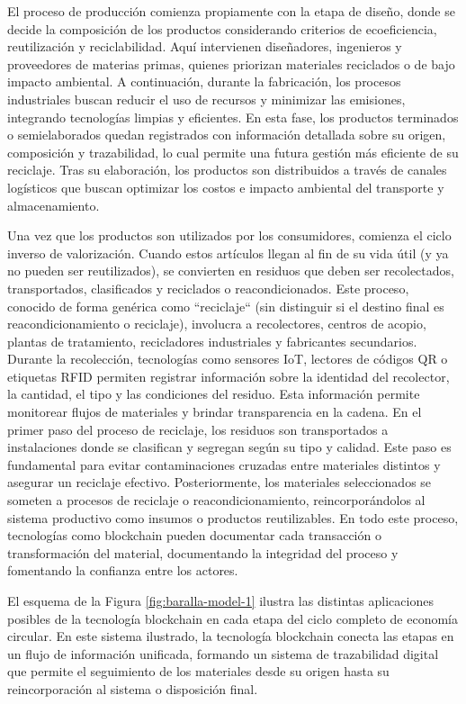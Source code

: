 El proceso de producción comienza propiamente con la etapa de diseño, donde se decide la composición de los productos considerando criterios de ecoeficiencia, reutilización y reciclabilidad. Aquí intervienen diseñadores, ingenieros y proveedores de materias primas, quienes priorizan materiales reciclados o de bajo impacto ambiental. A continuación, durante la fabricación, los procesos industriales buscan reducir el uso de recursos y minimizar las emisiones, integrando tecnologías limpias y eficientes. En esta fase, los productos terminados o semielaborados quedan registrados con información detallada sobre su origen, composición y trazabilidad, lo cual permite una futura gestión más eficiente de su reciclaje. Tras su elaboración, los productos son distribuidos a través de canales logísticos que buscan optimizar los costos e impacto ambiental del transporte y almacenamiento.

Una vez que los productos son utilizados por los consumidores, comienza el ciclo inverso de valorización. Cuando estos artículos llegan al fin de su vida útil (y ya no pueden ser reutilizados), se convierten en residuos que deben ser recolectados, transportados, clasificados y reciclados o reacondicionados. Este proceso, conocido de forma genérica como ``reciclaje`` (sin distinguir si el destino final es reacondicionamiento o reciclaje), involucra a recolectores, centros de acopio, plantas de tratamiento, recicladores industriales y fabricantes secundarios. Durante la recolección, tecnologías como sensores IoT, lectores de códigos QR o etiquetas RFID permiten registrar información sobre la identidad del recolector, la cantidad, el tipo y las condiciones del residuo. Esta información permite monitorear flujos de materiales y brindar transparencia en la cadena. En el primer paso del proceso de reciclaje, los residuos son transportados a instalaciones donde se clasifican y segregan según su tipo y calidad. Este paso es fundamental para evitar contaminaciones cruzadas entre materiales distintos y asegurar un reciclaje efectivo. Posteriormente, los materiales seleccionados se someten a procesos de reciclaje o reacondicionamiento, reincorporándolos al sistema productivo como insumos o productos reutilizables. En todo este proceso, tecnologías como blockchain pueden documentar cada transacción o transformación del material, documentando la integridad del proceso y fomentando la confianza entre los actores.

El esquema de la Figura \ref{fig:baralla-model-1} ilustra las distintas aplicaciones posibles de la tecnología blockchain en cada etapa del ciclo completo de economía circular. En este sistema ilustrado, la tecnología blockchain conecta las etapas en un flujo de información unificada, formando un sistema de trazabilidad digital que permite el seguimiento de los materiales desde su origen hasta su reincorporación al sistema o disposición final.


